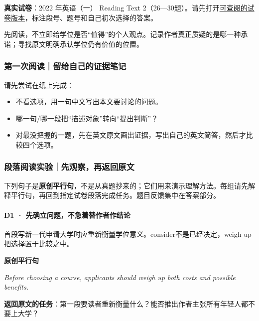 \documentclass[
  11pt,
]{ctexart}
\providecommand{\tightlist}{%
  \setlength{\itemsep}{0pt}\setlength{\parskip}{0pt}}
\renewenvironment{quote}{\begin{tcolorbox}[enhanced,breakable,colback=sand,colframe=primary!22,boxrule=0.4pt,arc=2pt,left=2.6mm,right=2.6mm,top=1.6mm,bottom=1.6mm]\itshape}{\end{tcolorbox}}
\begin{document}
\textbf{真实试卷}：2022 年英语（一） Reading Text
2（26---30题）。请先打开\href{https://ac-wiki.org/general-skills/study/assets/2022-201.pdf}{可查阅的试卷版本}，标注段号、题号和自己初次选择的答案。

先阅读，不立即给学位是否``值得''的个人观点。记录作者真正质疑的是哪一种承诺；寻找原文明确承认学位仍有价值的位置。

\subsubsection{第一次阅读｜留给自己的证据笔记}\label{ux7b2cux4e00ux6b21ux9605ux8bfbux7559ux7ed9ux81eaux5df1ux7684ux8bc1ux636eux7b14ux8bb0}

请先尝试在纸上完成：

\begin{itemize}
\tightlist
\item
  不看选项，用一句中文写出本文要讨论的问题。
\item
  哪一句/哪一段把``描述对象''转向``提出判断''？
\item
  对最没把握的一题，先在英文原文画出证据，写出自己的英文简答，然后才比较四个选项。
\end{itemize}

\subsubsection{段落阅读实验｜先观察，再返回原文}\label{ux6bb5ux843dux9605ux8bfbux5b9eux9a8cux5148ux89c2ux5bdfux518dux8fd4ux56deux539fux6587}

下列句子是\textbf{原创平行句}，不是从真题抄来的；它们用来演示理解方法。每组请先解释平行句，再回到指定试卷段落完成任务。题目反馈集中在答案部分。

\paragraph{D1 ·
先确立问题，不急着替作者作结论}\label{d1-ux5148ux786eux7acbux95eeux9898ux4e0dux6025ux7740ux66ffux4f5cux8005ux4f5cux7ed3ux8bba}

首段写新一代申请大学时应重新衡量学位意义。consider不是已经决定，weigh
up把选择置于比较之中。

\textbf{原创平行句}

\begin{quote}
Before choosing a course, applicants should weigh up both costs and
possible benefits.
\end{quote}

\textbf{返回原文的任务}：第一段要读者重新衡量什么？能否推出作者主张所有年轻人都不要上大学？
\end{document}
